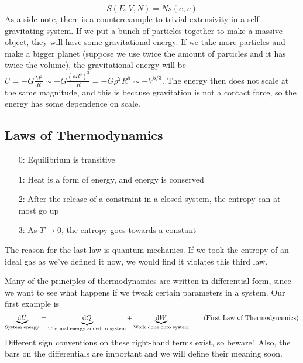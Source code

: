 \documentclass[a4paper,twoside,master.tex]{subfiles}
\begin{document}
\begin{itemize}
        \begin{equation}
            S(E,V,N) = N s(e, v)
        \end{equation}
        As a side note, there is a counterexample to trivial extensivity in a self-gravitating system. If we put a bunch of particles together to make a massive object, they will have some gravitational energy. If we take more particles and make a bigger planet (suppose we use twice the amount of particles and it has twice the volume), the gravitational energy will be $ U = - G \frac{M^2}{R} \sim - G \frac{(\rho R^3)^2}{R} = -G \rho^2 R^5 \sim - V^{5/3} $. The energy then does not scale at the same magnitude, and this is because gravitation is not a contact force, so the energy has some dependence on scale.
\end{itemize}

\subsection{Laws of Thermodynamics}
\label{sub:laws_of_thermodynamics}

\begin{itemize}
    \item[0:] Equilibrium is transitive
    \item[1:] Heat is a form of energy, and energy is conserved
    \item[2:] After the release of a constraint in a closed system, the entropy can at most go up
    \item[3:] As $ T \to 0 $, the entropy goes towards a constant
\end{itemize}

The reason for the last law is quantum mechanics. If we took the entropy of an ideal gas as we've defined it now, we would find it violates this third law.

Many of the principles of thermodynamics are written in differential form, since we want to see what happens if we tweak certain parameters in a system. Our first example is
\begin{equation}\label{eq:first_law_of_thermo}
    \underbrace{\dd{U}}_{\text{System energy}} = \underbrace{\dbar{Q}}_{\text{Thermal energy added to system}} + \underbrace{\dbar{W}}_{\text{Work done onto system}}\tag{First Law of Thermodynamics}
\end{equation}
Different sign conventions on these right-hand terms exist, so beware!\ Also, the bars on the differentials are important and we will define their meaning soon.
\end{document}

